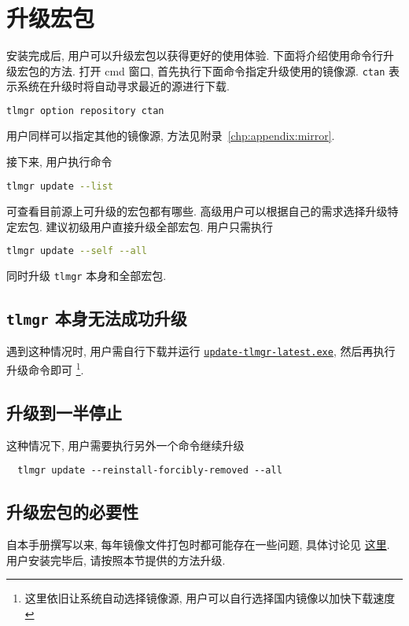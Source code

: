 \section{升级宏包}\label{sec:windows:update}

安装完成后, 用户可以升级宏包以获得更好的使用体验. 
下面将介绍使用命令行升级宏包的方法. 
打开 \textsf{cmd} 窗口, 首先执行下面命令指定升级使用的镜像源. 
\texttt{ctan} 表示系统在升级时将自动寻求最近的源进行下载. 
\begin{lstlisting}[language=bash]
  tlmgr option repository ctan
\end{lstlisting}
用户同样可以指定其他的镜像源,
方法见附录~\ref{chp:appendix:mirror}.

接下来, 用户执行命令
\begin{lstlisting}[language=bash]
  tlmgr update --list
\end{lstlisting}
可查看目前源上可升级的宏包都有哪些. 
高级用户可以根据自己的需求选择升级特定宏包.
建议初级用户直接升级全部宏包. 
用户只需执行
\begin{lstlisting}[language=bash]
  tlmgr update --self --all
\end{lstlisting}
同时升级 \texttt{tlmgr} 本身和全部宏包. 

\subsection{\texttt{tlmgr} 本身无法成功升级}

遇到这种情况时, 用户需自行下载并运行
\href{https://mirrors.ctan.org/systems/texlive/tlnet/update-tlmgr-latest.exe}{\texttt{update-tlmgr-latest.exe}},
然后再执行升级命令即可%
\footnote{这里依旧让系统自动选择镜像源,
用户可以自行选择国内镜像以加快下载速度}. 

\subsection{升级到一半停止}

这种情况下, 用户需要执行另外一个命令继续升级
\begin{lstlisting}
  tlmgr update --reinstall-forcibly-removed --all
\end{lstlisting}

\subsection{升级宏包的必要性}

自本手册撰写以来,
每年镜像文件打包时都可能存在一些问题,
具体讨论见%
\href{https://github.com/CTeX-org/ctex-kit/issues/569}{这里}.
用户安装完毕后,
请按照本节提供的方法升级.

